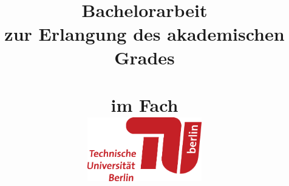 \author{}
\title{ \vspace{-3cm}\dctitle \\
\vspace{0.5cm}
\large{\dcsubtitle} \\
\vspace{0.5cm} {\Large \textbf{Bachelorarbeit}}\\
\vspace{0.5cm} \large{zur Erlangung des akademischen Grades \\
\dcdegree\\ im Fach \dcsubject \\\vspace{0.5cm}
\includegraphics[width=5cm]{Figures/TUBlogo}\\ 
\vspace{0.5cm}
\dcuniversity \\
\dcfaculty \\
\dcinstitute\\}}
%
%
